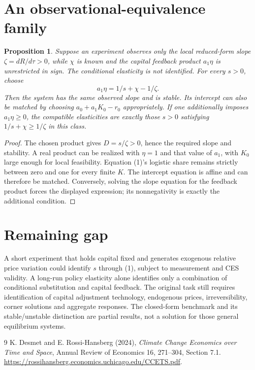 \documentclass[11pt]{article}
\newtheorem{proposition}[theorem]{Proposition}
\theoremstyle{definition}
\begin{document}
\section*{An observational-equivalence family}
\begin{proposition}
Suppose an experiment observes only the local reduced-form slope
$\zeta=dR/d\tau>0$, while $\chi$ is known and the capital feedback product
$a_1\eta$ is unrestricted in sign. The conditional elasticity is not
identified. For every $s>0$, choose
\[
 a_1\eta=1/s+\chi-1/\zeta.
\]
Then the system has the same observed slope and is stable. Its intercept
can also be matched by choosing $a_0+a_1K_0-r_0$ appropriately.
If one additionally imposes $a_1\eta\ge0$, the compatible elasticities
are exactly those $s>0$ satisfying $1/s+\chi\ge1/\zeta$ in this class.
\end{proposition}
\begin{proof}
The chosen product gives $D=s/\zeta>0$, hence the required slope and
stability. A real product can be realized with $\eta=1$ and that value
of $a_1$, with $K_0$ large enough for local feasibility. Equation (1)'s
logistic share remains strictly between zero and one for every finite $K$.
The intercept equation is affine and can therefore be matched. Conversely,
solving the slope equation for the feedback product forces the displayed
expression; its nonnegativity is exactly the additional condition.
\end{proof}

\section*{Remaining gap}
A short experiment that holds capital fixed and generates exogenous relative
price variation could identify $s$ through (1), subject to measurement and
CES validity. A long-run policy elasticity alone identifies only a combination
of conditional substitution and capital feedback. The original task still
requires identification of capital adjustment technology, endogenous prices,
irreversibility, corner solutions and aggregate responses. The closed-form
benchmark and its stable/unstable distinction are partial results, not a
solution for those general equilibrium systems.

\begin{thebibliography}{9}
 K. Desmet and E. Rossi-Hansberg (2024),
\emph{Climate Change Economics over Time and Space}, Annual Review of
Economics 16, 271--304, Section 7.1.
\url{https://rossihansberg.economics.uchicago.edu/CCETS.pdf}.
\end{thebibliography}
\end{document}

